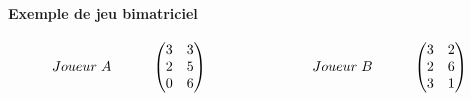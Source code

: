 \documentclass[a4paper, 12pt, twoside]{article}
\begin{document}
\paragraph{Exemple de jeu bimatriciel}
\[
Joueur\hspace{0,1cm} A\hspace{1cm}
\begin{pmatrix}3&3\\
2&5\\
0&6\\
\end{pmatrix}\                      \hspace{2,5cm}  
Joueur\hspace{0,1cm} B \hspace{1cm}  
\begin{pmatrix}3&2\\
2&6\\
3&1\\
\end{pmatrix} 
\]
\end{document}
